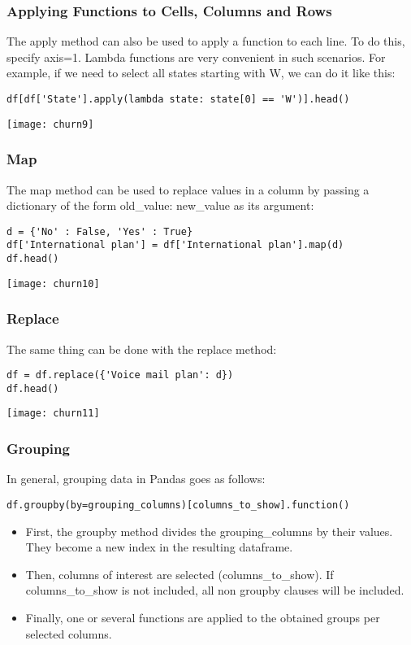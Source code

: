 \begin{frame}[fragile]\frametitle{Applying Functions to Cells, Columns and Rows}	
The apply method can also be used to apply a function to each line. To do this, specify axis=1. Lambda functions are very convenient in such scenarios. For example, if we need to select all states starting with W, we can do it like this:
\begin{lstlisting}
df[df['State'].apply(lambda state: state[0] == 'W')].head()
\end{lstlisting}
\begin{center}
\texttt{[image: churn9]}
\end{center}
\end{frame}

\begin{frame}[fragile]\frametitle{Map}	
The map method can be used to replace values in a column by passing a dictionary of the form {old\_value: new\_value} as its argument:
\begin{lstlisting}
d = {'No' : False, 'Yes' : True}
df['International plan'] = df['International plan'].map(d)
df.head()
\end{lstlisting}
\begin{center}
\texttt{[image: churn10]}
\end{center}
\end{frame}

\begin{frame}[fragile]\frametitle{Replace}	
The same thing can be done with the replace method:
\begin{lstlisting}
df = df.replace({'Voice mail plan': d})
df.head()
\end{lstlisting}
\begin{center}
\texttt{[image: churn11]}
\end{center}
\end{frame}

\begin{frame}[fragile]\frametitle{Grouping}	
In general, grouping data in Pandas goes as follows:
\begin{lstlisting}
df.groupby(by=grouping_columns)[columns_to_show].function()
\end{lstlisting}
\begin{itemize}
\item First, the groupby method divides the grouping\_columns by their values. They become a new index in the resulting dataframe.
\item Then, columns of interest are selected (columns\_to\_show). If columns\_to\_show is not included, all non groupby clauses will be included.
\item Finally, one or several functions are applied to the obtained groups per selected columns.
\end{itemize}
\end{frame}


